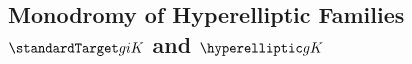 %
%
%
%
\subsection{Monodromy of Hyperelliptic Families $\standardTarget g i K$ and $\hyperelliptic g K$}
\label{subsection:monodromy-of-families}

